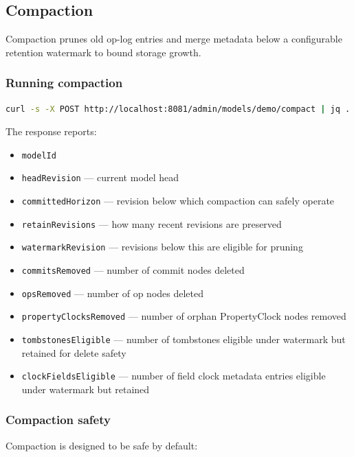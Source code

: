 \subsection{Compaction}

Compaction prunes old op-log entries and merge metadata below a configurable
retention watermark to bound storage growth.

\subsubsection{Running compaction}

\begin{lstlisting}[language=bash,caption={Compact a model}]
curl -s -X POST http://localhost:8081/admin/models/demo/compact | jq .
\end{lstlisting}

The response reports:

\begin{itemize}
\item \texttt{modelId}
\item \texttt{headRevision} --- current model head
\item \texttt{committedHorizon} --- revision below which compaction can safely operate
\item \texttt{retainRevisions} --- how many recent revisions are preserved
\item \texttt{watermarkRevision} --- revisions below this are eligible for pruning
\item \texttt{commitsRemoved} --- number of commit nodes deleted
\item \texttt{opsRemoved} --- number of op nodes deleted
\item \texttt{propertyClocksRemoved} --- number of orphan PropertyClock
  nodes removed
\item \texttt{tombstonesEligible} --- number of tombstones eligible under
  watermark but retained for delete safety
\item \texttt{clockFieldsEligible} --- number of field clock metadata
  entries eligible under watermark but retained
\end{itemize}

\subsubsection{Compaction safety}

Compaction is designed to be safe by default:

